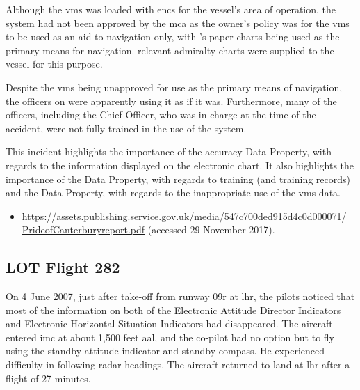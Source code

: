 Although the \gls{vms} was loaded with \glspl{enc} for the vessel's area of operation, the system had not been approved by the \gls{mca} as the owner's policy was for the \gls{vms} to be used as an aid to navigation only, with 's paper charts being used as the primary means for navigation. relevant admiralty charts were supplied to the vessel for this purpose.

Despite the \gls{vms} being unapproved for use as the primary means of navigation, the officers on  were apparently using it as if it was. Furthermore, many of the officers, including the Chief Officer, who was in charge at the time of the accident, were not fully trained in the use of the system.

This incident highlights the importance of the \gls{accuracy} Data Property, with regards to the information displayed on the electronic chart. It also highlights the importance of the  Data Property, with regards to training (and training records) and the  Data Property, with regards to the inappropriate use of the \gls{vms} data.

\begin{samepage}
\begin{itemize}
  \item \raggedright{\href{https://assets.publishing.service.gov.uk/media/547c700ded915d4c0d000071/PrideofCanterburyreport.pdf}{https://assets.publishing.service.gov.uk/media/547c700ded915d4c0d000071/ PrideofCanterburyreport.pdf} (accessed 29 November 2017).}
\end{itemize}
\end{samepage}


\subsection{LOT Flight 282} \label{bkm:incacc:lot282}
On 4 June 2007, just after take-off from runway 09r at \gls{lhr}, the pilots noticed that most of the information on both of the Electronic Attitude Director Indicators and Electronic Horizontal Situation Indicators had disappeared. The aircraft entered \gls{imc} at about 1,500 feet \gls{aal}, and the co-pilot had no option but to fly using the standby attitude indicator and standby compass. He experienced difficulty in following radar headings. The aircraft returned to land at \gls{lhr} after a flight of 27 minutes.


